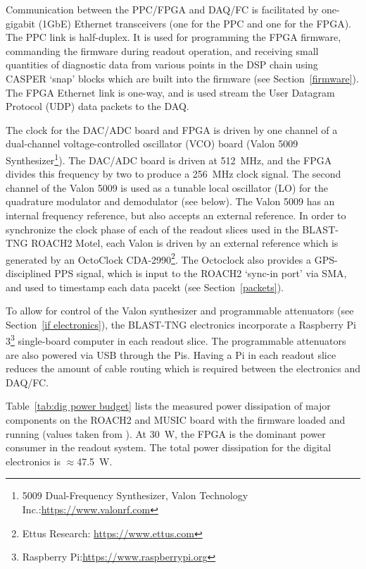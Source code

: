 Communication between the PPC/FPGA and DAQ/FC is facilitated by one-gigabit (1GbE) Ethernet transceivers (one for the PPC and one for the FPGA). The PPC link is half-duplex. It is used for programming the FPGA firmware, commanding the firmware during readout operation, and receiving small quantities of diagnostic data from various points in the DSP chain using CASPER `snap' blocks which are built into the firmware (see Section~\ref{firmware}). The FPGA Ethernet link is one-way, and is used stream the User Datagram Protocol (UDP) data packets to the DAQ.

The clock for the DAC/ADC board and FPGA is driven by one channel of a dual-channel voltage-controlled oscillator (VCO) board (Valon 5009 Synthesizer\footnote{5009 Dual-Frequency Synthesizer, Valon Technology Inc.:\url{https://www.valonrf.com}}). The DAC/ADC board is driven at 512~MHz, and the FPGA divides this frequency by two to produce a 256~MHz clock signal. The second channel of the Valon 5009 is used as a tunable local oscillator (LO) for the quadrature modulator and demodulator (see below). The Valon 5009 has an internal frequency reference, but also accepts an external reference. In order to synchronize the clock phase of each of the readout slices used in the BLAST-TNG ROACH2 Motel, each Valon is driven by an external reference which is generated by an
OctoClock CDA-2990\footnote{Ettus Research: \url{https://www.ettus.com}}. The Octoclock also provides a GPS-disciplined PPS signal, which is input to the ROACH2 `sync-in port' via SMA, and used to timestamp each data pacekt (see Section~\ref{packets}).

To allow for control of the Valon synthesizer and programmable attenuators (see Section~\ref{if electronics}), the BLAST-TNG electronics incorporate a Raspberry Pi 3\footnote{Raspberry Pi:\url{https://www.raspberrypi.org}} single-board computer in each readout slice. The programmable attenuators are also powered via USB through the Pis. Having a Pi in each readout slice reduces the amount of cable routing which is required between the electronics and DAQ/FC.

Table~\ref{tab:dig power budget} lists the measured power dissipation of major components on the ROACH2 and MUSIC board with the firmware loaded and running (values taken from \citet{gordon2016}). At 30~W, the FPGA is the dominant power consumer in the readout system. The total power dissipation for the digital electronics is $\approx$47.5~W.

